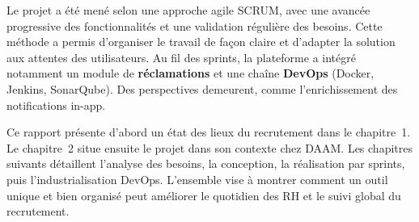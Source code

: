 Le projet a été mené selon une approche agile SCRUM, avec une avancée progressive
des fonctionnalités et une validation régulière des besoins. Cette méthode a permis
d'organiser le travail de façon claire et d'adapter la solution aux attentes des
utilisateurs. Au fil des sprints, la plateforme a intégré notamment un module de
\textbf{réclamations} et une chaîne \textbf{DevOps} (Docker, Jenkins, SonarQube).
Des perspectives demeurent, comme l'enrichissement des notifications in-app.

Ce rapport présente d'abord un état des lieux du recrutement dans le chapitre~1.
Le chapitre~2 situe ensuite le projet dans son contexte chez DAAM. Les chapitres
suivants détaillent l'analyse des besoins, la conception, la réalisation par
sprints, puis l'industrialisation DevOps. L'ensemble vise à montrer comment un
outil unique et bien organisé peut améliorer le quotidien des RH et le suivi
global du recrutement.

\endgroup
\clearpage
